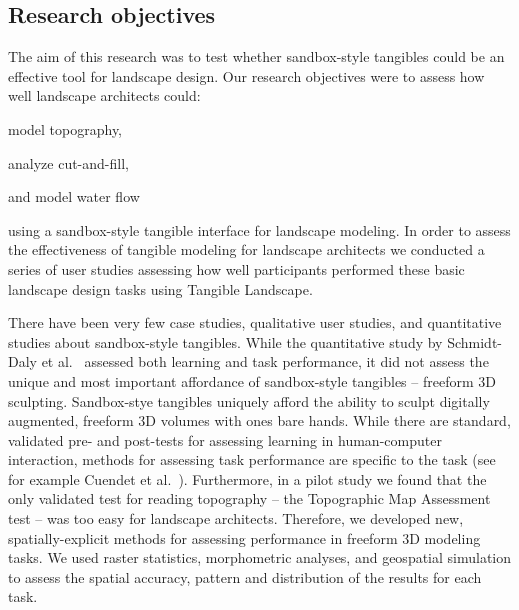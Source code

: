 \documentclass[Afour,sagev,times]{sagej} %
\begin{document}
\subsection{Research objectives}
The aim of this research was to test whether
sandbox-style tangibles could be an effective tool
for landscape design. 
%
Our research objectives were 
to assess how well landscape architects could:
\begin{enumerate*}[label=\alph*),font=\itshape]
\item model topography, 
\item analyze cut-and-fill, 
\item and model water flow
\end{enumerate*}
using a sandbox-style tangible interface for landscape modeling.
%
In order to assess the effectiveness 
of tangible modeling for landscape architects 
we conducted a series of user studies
assessing how well participants performed
these basic landscape design tasks 
using Tangible Landscape.

There have been very few 
case studies, \cite{Ishii2002,Tateosian2010,Petrasova2015}
qualitative user studies, 
\cite{Shamonsky2003,Woods2016}
and quantitative studies \cite{Schmidt-daly2016b}
about sandbox-style tangibles.
%
While the quantitative study by
Schmidt-Daly et al.~\cite{Schmidt-daly2016b} 
assessed both learning and task performance,
it did not assess the unique and most important 
affordance of sandbox-style tangibles --
freeform 3D sculpting. 
% 
Sandbox-stye tangibles uniquely afford
the ability to sculpt digitally augmented, 
freeform 3D volumes
with ones bare hands. 
%
While there are standard, validated
pre- and post-tests for assessing learning
in human-computer interaction,
methods for assessing task performance 
are specific to the task
(see for example Cuendet et al.~\cite{Cuendet2012}).
%
Furthermore,
in a pilot study we found that the only 
validated test for reading topography -- the
Topographic Map Assessment test
\cite{Newcombe2015} --
was too easy for landscape architects.
%
Therefore, we developed 
new, spatially-explicit methods
for assessing performance
in freeform 3D modeling tasks.
%
We used raster statistics, 
morphometric analyses, and geospatial simulation
to assess the spatial accuracy, pattern and distribution
of the results for each task. 

\end{document}
